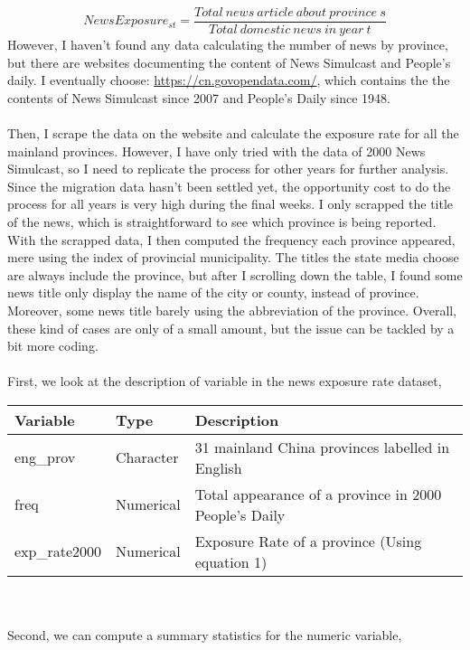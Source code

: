 \documentclass{article}
\begin{document}
\begin{equation} \label{ert}
    NewsExposure_{st}=\frac{Total\ news\ article\ about\ province\ s}{Total\ domestic\ news\ in\ year\ t}
\end{equation}
However, I haven't found any data calculating the number of news by province, but there are websites documenting the content of News Simulcast and People's daily. I eventually choose: \url{https://cn.govopendata.com/}, which contains the the contents of News Simulcast since 2007 and People's Daily since 1948.\\~\\
Then, I scrape the data on the website and calculate the exposure rate for all the mainland provinces. However, I have only tried with the data of 2000 News Simulcast, so I need to replicate the process for other years for further analysis. Since the migration data hasn't been settled yet, the opportunity cost to do the process for all years is very high during the final weeks. I only scrapped the title of the news, which is straightforward to see which province is being reported. With the scrapped data, I then computed the frequency each province appeared, mere using the index of provincial municipality. The titles the state media choose are always include the province,  but after I scrolling down the table, I found some news title only display the name of the city or county, instead of province. Moreover, some news title barely using the abbreviation of the province. Overall, these kind of cases are only of a small amount, but the issue can be tackled by a bit more coding.
\\~\\
First, we look at the description of variable in the news exposure rate dataset,
\begin{table}[H]
\centering
\captionsetup{labelfont=bf}
\label{tab:title}
\begin{tabular}{lll}
  \hline
  Variable & Type &Description \\ 
  \hline
  eng\_prov & Character & 31 mainland China provinces labelled in English \\ 
  freq  & Numerical &Total appearance of a province in 2000 People's Daily \\ 
  exp\_rate2000 & Numerical &  Exposure Rate of a province (Using equation 1) \\
   \hline
\end{tabular}
\end{table}
\\~\\
Second, we can compute a summary statistics for the numeric variable,
\end{document}
